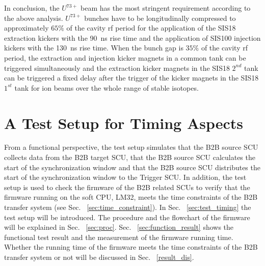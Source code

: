 In conclusion, the $U^\mathit{73+}$ beam has the most stringent requirement according to the above analysis. $U^\mathit{73+}$ bunches have to be longitudinally compressed to approximately $65\%$ of the cavity rf period for the application of the SIS18 extraction kickers with the \SI{90}{ns} rise time and the application of SIS100 injection kickers with the \SI{130}{ns} rise time. When the bunch gap is $35\%$ of the cavity rf period, the extraction and injection kicker magnets in a common tank can be triggered simultaneously and the extraction kicker magnets in the SIS18 $2^{nd}$ tank can be triggered a fixed delay after the trigger of the kicker magnets in the SIS18  $1^{st}$ tank for ion beams over the whole range of stable isotopes.
\section{A Test Setup for Timing Aspects}
\label{real_test}

From a functional perspective, the test setup simulates that the B2B source SCU collects data from the B2B target SCU, that the B2B source SCU calculates the start of the synchronization window and that the B2B source SCU distributes the start of the synchronization window to the Trigger SCU. In addition, the test setup is used to check the firmware of the B2B related SCUs to verify that the firmware running on the soft CPU, LM32, meets the time constraints of the B2B transfer system (see Sec. ~\ref{sec:time_constraint}).  In Sec. ~\ref{sec:test_timing} the test setup will be introduced. The procedure and the flowchart of the firmware will be explained in Sec. ~\ref{sec:proc}. Sec. ~\ref{sec:function_result} shows the functional test result and the measurement of the firmware running time. Whether the running time of the firmware meets the time constraints of the B2B transfer system or not will be discussed in Sec. ~\ref{result_dis}.  



